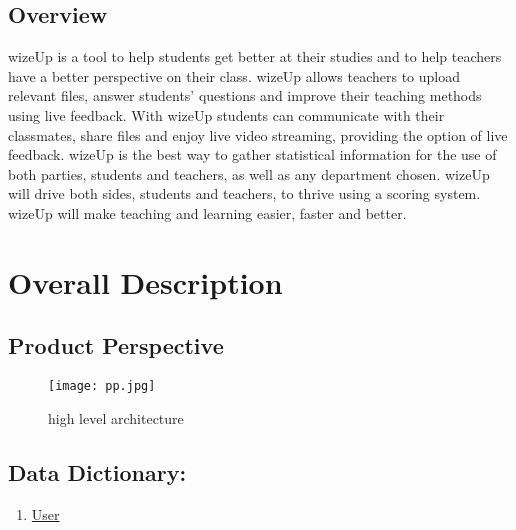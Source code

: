 \documentclass[12pt,a4paper]{article}
\begin{document}
    \subsection{Overview}
    wizeUp is a tool to help students get better at their studies and to
    help teachers have a better perspective on their class. wizeUp
    allows teachers to upload relevant files, answer students' questions and
    improve their teaching methods using live feedback. With
    wizeUp students can communicate with their classmates, share files
    and enjoy live video streaming, providing the option of live feedback.
    \newline
    wizeUp is the best way to gather statistical information for the use
    of both parties, students and teachers, as well as any department
    chosen. wizeUp will drive both sides, students and teachers, to
    thrive using a scoring system. wizeUp will make teaching and
    learning easier, faster and better.

    \newpage

    \section{Overall Description}

    \subsection{Product Perspective}

    \begin{figure}[h!]
        \texttt{[image: pp.jpg]}
        \caption{high level architecture}
        \label{fig: figure}
    \end{figure}



    \newpage


    \subsection{Data Dictionary:}


    \begin{enumerate}
        \item \underline{User}
        \setcounter{numberedCntBA}{\theenumi}
    \end{enumerate}
\end{document}
